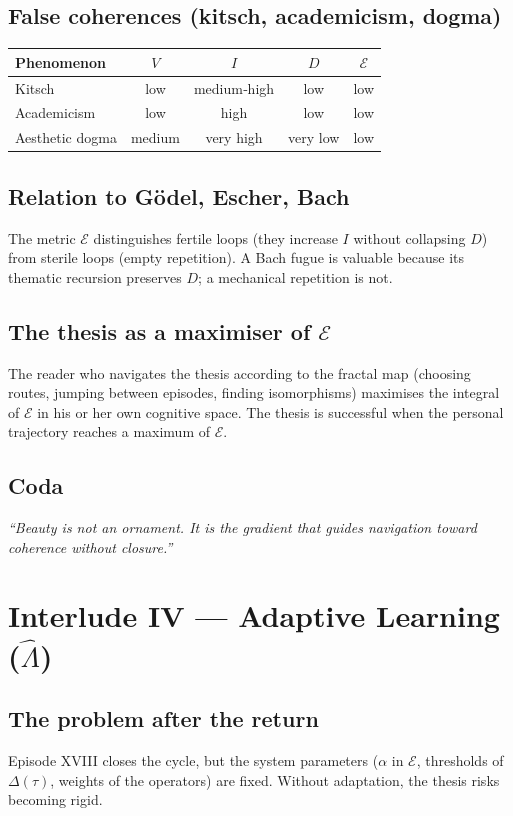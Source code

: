 \documentclass[12pt,oneside]{report}
\begin{document}
\section{False coherences (kitsch, academicism, dogma)}
\begin{tabular}{lcccc}
\toprule
Phenomenon & \(V\) & \(I\) & \(D\) & \(\mathcal{E}\) \\
\midrule
Kitsch & low & medium‑high & low & low \\
Academicism & low & high & low & low \\
Aesthetic dogma & medium & very high & very low & low \\
\bottomrule
\end{tabular}

\section{Relation to Gödel, Escher, Bach}
The metric \(\mathcal{E}\) distinguishes fertile loops (they increase \(I\) without collapsing \(D\)) from sterile loops (empty repetition). A Bach fugue is valuable because its thematic recursion preserves \(D\); a mechanical repetition is not.

\section{The thesis as a maximiser of \(\mathcal{E}\)}
The reader who navigates the thesis according to the fractal map (choosing routes, jumping between episodes, finding isomorphisms) maximises the integral of \(\mathcal{E}\) in his or her own cognitive space. The thesis is successful when the personal trajectory reaches a maximum of \(\mathcal{E}\).

\section{Coda}
\emph{“Beauty is not an ornament. It is the gradient that guides navigation toward coherence without closure.”}

\chapter{Interlude IV — Adaptive Learning (\(\hat{\Lambda}\))}

\section{The problem after the return}
Episode XVIII closes the cycle, but the system parameters (\(\alpha\) in \(\mathcal{E}\), thresholds of \(\Delta(\tau)\), weights of the operators) are fixed. Without adaptation, the thesis risks becoming rigid.
\end{document}

